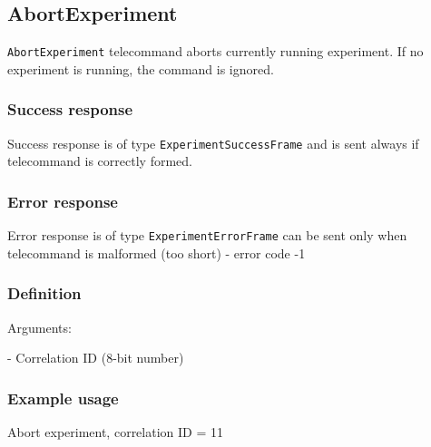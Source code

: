 \subsection{AbortExperiment}
\texttt{AbortExperiment} telecommand aborts currently running experiment.
If no experiment is running, the command is ignored.

\subsubsection{Success response}
Success response is of type \texttt{ExperimentSuccessFrame} and is sent always if telecommand is correctly formed. 

\subsubsection{Error response}
Error response is of type \texttt{ExperimentErrorFrame} can be sent only when telecommand is malformed (too short) - error code -1

\subsubsection{Definition}

Arguments: 
\begin{description}[labelindent=1cm]
	\item[\texttt{correlation\_id}] - Correlation ID (8-bit number)
\end{description}

\subsubsection{Example usage}
Abort experiment, correlation ID = 11


